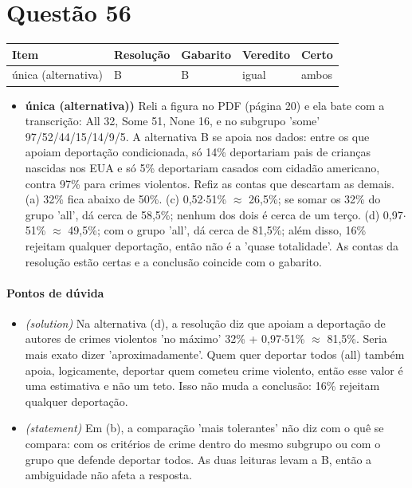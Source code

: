 \documentclass{article}%
\begin{document}
\section*{Questão 56}%
\begin{longtable}{@{}p{} p{} p{} p{} p{}@{}}\toprule Item & Resolução & Gabarito & Veredito & Certo \\ \midrule
única (alternativa) & B & B & igual & ambos \\
\bottomrule\end{longtable}%
\begin{itemize}%
\item%
\textbf{única (alternativa))} Reli a figura no PDF (página 20) e ela bate com a transcrição: All 32, Some 51, None 16, e no subgrupo 'some' 97/52/44/15/14/9/5. A alternativa B se apoia nos dados: entre os que apoiam deportação condicionada, só 14\% deportariam pais de crianças nascidas nos EUA e só 5\% deportariam casados com cidadão americano, contra 97\% para crimes violentos. Refiz as contas que descartam as demais. (a) 32\% fica abaixo de 50\%. (c) 0,52$\cdot$51\% $\approx$ 26,5\%; se somar os 32\% do grupo 'all', dá cerca de 58,5\%; nenhum dos dois é cerca de um terço. (d) 0,97$\cdot$51\% $\approx$ 49,5\%; com o grupo 'all', dá cerca de 81,5\%; além disso, 16\% rejeitam qualquer deportação, então não é a 'quase totalidade'. As contas da resolução estão certas e a conclusão coincide com o gabarito.%
\end{itemize}%
\paragraph{Pontos de dúvida}%
\begin{itemize}%
\item%
\textit{(solution)} Na alternativa (d), a resolução diz que apoiam a deportação de autores de crimes violentos 'no máximo' 32\% + 0,97$\cdot$51\% $\approx$ 81,5\%. Seria mais exato dizer 'aproximadamente'. Quem quer deportar todos (all) também apoia, logicamente, deportar quem cometeu crime violento, então esse valor é uma estimativa e não um teto. Isso não muda a conclusão: 16\% rejeitam qualquer deportação.%
\item%
\textit{(statement)} Em (b), a comparação 'mais tolerantes' não diz com o quê se compara: com os critérios de crime dentro do mesmo subgrupo ou com o grupo que defende deportar todos. As duas leituras levam a B, então a ambiguidade não afeta a resposta.%
\end{itemize}%
\end{document}
